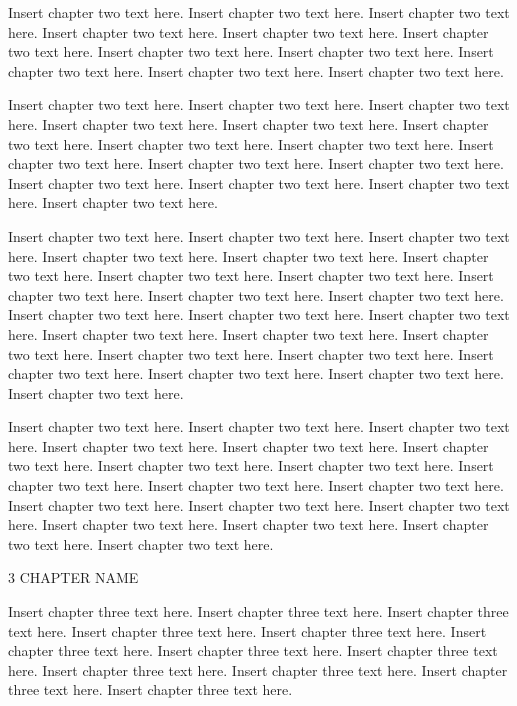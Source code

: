 Insert chapter two text here. Insert chapter two text here. Insert chapter two text here. Insert chapter two text here. Insert chapter two text here. Insert chapter two text here. Insert chapter two text here. Insert chapter two text here. Insert chapter two text here. Insert chapter two text here. Insert chapter two text here. 

Insert chapter two text here. Insert chapter two text here. Insert chapter two text here. Insert chapter two text here. Insert chapter two text here. Insert chapter two text here. Insert chapter two text here. Insert chapter two text here. Insert chapter two text here. Insert chapter two text here. Insert chapter two text here. Insert chapter two text here. Insert chapter two text here. Insert chapter two text here. Insert chapter two text here. 

Insert chapter two text here. Insert chapter two text here. Insert chapter two text here. Insert chapter two text here. Insert chapter two text here. Insert chapter two text here. Insert chapter two text here. Insert chapter two text here. Insert chapter two text here. Insert chapter two text here. Insert chapter two text here. Insert chapter two text here. Insert chapter two text here. Insert chapter two text here. Insert chapter two text here. Insert chapter two text here. Insert chapter two text here. Insert chapter two text here. Insert chapter two text here. Insert chapter two text here. Insert chapter two text here. Insert chapter two text here. Insert chapter two text here. 

Insert chapter two text here. Insert chapter two text here. Insert chapter two text here. Insert chapter two text here. Insert chapter two text here. Insert chapter two text here. Insert chapter two text here. Insert chapter two text here. Insert chapter two text here. Insert chapter two text here. Insert chapter two text here. Insert chapter two text here. Insert chapter two text here. Insert chapter two text here. Insert chapter two text here. Insert chapter two text here. Insert chapter two text here. Insert chapter two text here.

3 CHAPTER NAME

Insert chapter three text here. Insert chapter three text here. Insert chapter three text here. Insert chapter three text here. Insert chapter three text here. Insert chapter three text here. Insert chapter three text here. Insert chapter three text here. Insert chapter three text here. Insert chapter three text here. Insert chapter three text here. Insert chapter three text here.

